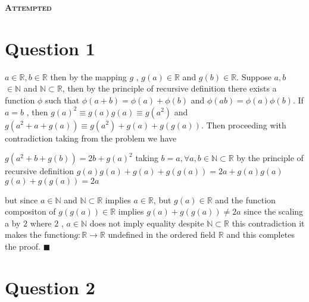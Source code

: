 \documentclass[a4paper, 12pt]{article}
\begin{document}
\begin{center}
    \fontsize{24pt}{10pt}\selectfont
    \textsc{\textbf{Attempted}}
\end{center}

\section{Question 1}

$a  \in  \mathbb{R}, b  \in  \mathbb{R}$ then by  the mapping $g$ , $g(a)  \in \mathbb{R}$ and
$g(b) \in \mathbb{R}$. Suppose $a,b$ $\in \mathbb{N}$  and $\mathbb{N} \subset \mathbb{R}$, 
then by the principle of recursive definition there exists a function $\phi$ such that
$\phi(a + b) = \phi(a) + \phi(b)$ and $\phi(ab) = \phi(a)\phi(b)$.
If $a = b$ , then $g(a)^2 \equiv g(a)g(a) \equiv g(a^2)$  and $g(a^2 + a + g(a)) \equiv g(a^2)  + g(a) + g(g(a))$.
Then proceeding with contradiction taking from the problem we have

   \begin{justify} 
    \begin{center}
    $g(a^2 + b + g(b)) = 2b + g(a)^2$ \newline
    taking $b = a, \forall a,b \in \mathbb{N} \subset\mathbb{R}$ \newline 
    by the principle of recursive definition \newline
    $g(a)g(a) + g(a) + g(g(a)) = 2a + g(a)g(a)$ \newline
    $g(a) + g(g(a)) = 2a$ \newline
    \end{center}
   \end{justify}

but since $a \in \mathbb{N}$ and $\mathbb{N} \subset \mathbb{R}$ implies  $a \in \mathbb{R}$,
but $g(a) \in \mathbb{R}$ and the function compositon of $g(g(a)) \in \mathbb{R}$ implies $g(a) + g(g(a))\neq 2a$ \newline
since the scaling a by $2$ where $2$ , $a \in\mathbb{N}$ does not imply equality despite $\mathbb{N} \subset \mathbb{R}$ \newline
this contradiction it makes the function$ g:\mathbb{R}\longrightarrow \mathbb{R}$ \newline
undefined in the ordered field $\mathbb{R}$ and this 
completes the proof. $\blacksquare$

\newpage

\section{Question 2}
\end{document}
